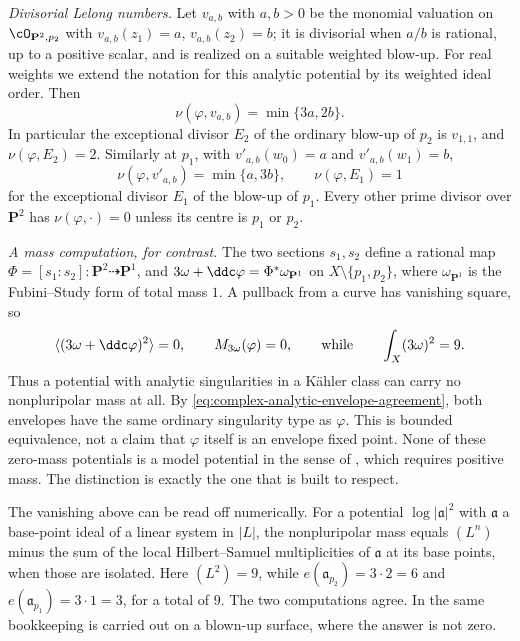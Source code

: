 \begin{example}
\emph{Divisorial Lelong numbers.}  Let $v_{a,b}$ with $a,b>0$ be the
monomial valuation on $\cO_{\mathbf P^2,p_2}$ with
$v_{a,b}(z_1)=a$, $v_{a,b}(z_2)=b$; it is divisorial when $a/b$ is
rational, up to a positive scalar, and is realized on a suitable
weighted blow-up.  For real weights we extend the notation for this
analytic potential by its weighted ideal order.  Then
\[
 \nu(\varphi,v_{a,b})=\min\{3a,2b\}.
\]
In particular the exceptional divisor $E_2$ of the ordinary blow-up of
$p_2$ is $v_{1,1}$, and $\nu(\varphi,E_2)=2$.  Similarly at
$p_1$, with $v'_{a,b}(w_0)=a$ and $v'_{a,b}(w_1)=b$,
\[
 \nu(\varphi,v'_{a,b})=\min\{a,3b\},
 \qquad
 \nu(\varphi,E_1)=1
\]
for the exceptional divisor $E_1$ of the blow-up of $p_1$.  Every
other prime divisor over $\mathbf P^2$ has $\nu(\varphi,\cdot)=0$
unless its centre is $p_1$ or $p_2$.

\emph{A mass computation, for contrast.}  The two sections $s_1,s_2$
define a rational map $\Phi=[s_1:s_2]:\mathbf P^2\dashrightarrow
\mathbf P^1$, and $3\omega+\ddc\varphi=\Phi^*\omega_{\mathbf P^1}$ on
$X\setminus\{p_1,p_2\}$, where $\omega_{\mathbf P^1}$ is the
Fubini--Study form of total mass $1$.  A pullback from a curve has
vanishing square, so
\[
 \langle(3\omega+\ddc\varphi)^2\rangle=0,
 \qquad
 M_{3\omega}(\varphi)=0,
 \qquad\text{while}\qquad
 \int_X(3\omega)^2=9 .
\]
Thus a potential with analytic singularities in a K\"ahler class can carry
no nonpluripolar mass at all.  By
\eqref{eq:complex-analytic-envelope-agreement}, both envelopes have
the same ordinary singularity type as $\varphi$.  This is bounded
equivalence, not a claim that $\varphi$ itself is an envelope fixed point.
None of these zero-mass potentials is a model potential in the sense of
, which requires positive mass.
The distinction is exactly the one that
 is built to respect.
\end{example}

\begin{remark}
\label{rem:ch51-p2-multiplicity}
The vanishing above can be read off numerically.  For a potential
$\log|\mathfrak a|^2$ with $\mathfrak a$ a base-point ideal of a
linear system in $|L|$, the nonpluripolar mass equals
$(L^n)$ minus the sum of the local Hilbert--Samuel multiplicities of
$\mathfrak a$ at its base points, when those are isolated.  Here
$(L^2)=9$, while
$e(\mathfrak a_{p_2})=3\cdot2=6$ and
$e(\mathfrak a_{p_1})=3\cdot1=3$, for a total of $9$.  The two
computations agree.  In  the same bookkeeping is
carried out on a blown-up surface, where the answer is not zero.
\end{remark}

